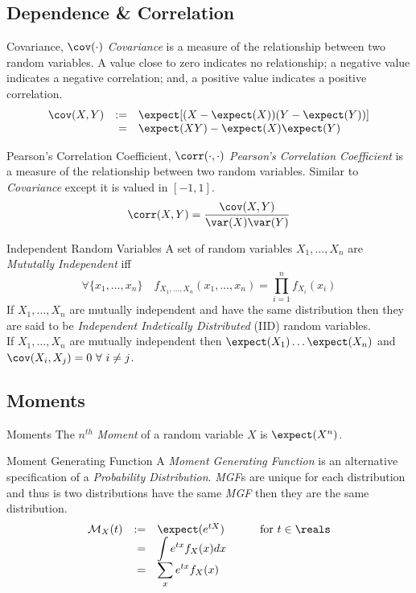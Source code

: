 \documentclass[11pt,a4paper]{article}
\begin{document}
\subsection{Dependence \& Correlation}

\begin{definition}{Covariance, $\cov(\cdot)$}
\textit{Covariance} is a measure of the relationship between two random variables. A value close to zero indicates no relationship; a negative value indicates a negative correlation; and, a positive value indicates a positive correlation.
\[\begin{array}{rrl}
\cov(X,Y)&:=&\expect[(X-\expect(X))(Y-\expect(Y))]\\
&=&\expect(XY)-\expect(X)\expect(Y)
\end{array}\]
\end{definition}

\begin{definition}{Pearson's Correlation Coefficient, $\corr(\cdot,\cdot)$}
  \textit{Pearson's Correlation Coefficient} is a measure of the relationship between two random variables. Similar to \textit{Covariance} except it is valued in $[-1,1]$.
  \[ \corr(X,Y)=\frac{\cov(X,Y)}{\var(X)\var(Y)} \]
\end{definition}

\begin{definition}{Independent Random Variables}
  A set of random variables $X_1,\dots,X_n$ are \textit{Mututally Independent} iff
  \[ \forall\{x_1,\dots,x_n\}\quad f_{X_1,\dots,X_n}(x_1,\dots,x_n)=\prod_{i=1}^nf_{X_i}(x_i) \]
  If $X_1,\dots,X_n$ are mutually independent and have the same distribution then they are said to be \textit{Independent Indetically Distributed} (IID) random variables.\\
  If $X_1,\dots,X_n$ are mutually independent then $\expect(X_1)\dots\expect(X_n)$ and $\cov(X_i,X_j)=0\ \forall\ i\neq j$.
\end{definition}

\subsection{Moments}

\begin{definition}{Moments}
  The $n^{th}$ \textit{Moment} of a random variable $X$ is $\expect(X^n)$.
\end{definition}

\begin{definition}{Moment Generating Function}
  A \textit{Moment Generating Function} is an alternative specification of a \textit{Probability Distribution}. \textit{MGF}s are unique for each distribution and thus is two distributions have the same \textit{MGF} then they are the same distribution.
  \[\begin{array}{rrlcl}
  \mathcal{M}_X(t)&:=&\expect(e^{tX})&\quad&\text{for }t\in\reals\\
  &=&\displaystyle\int e^{tx}f_X(x)dx\\
  &=&\displaystyle\sum_xe^{tx}f_X(x)
  \end{array}\]
\end{definition}
\end{document}
